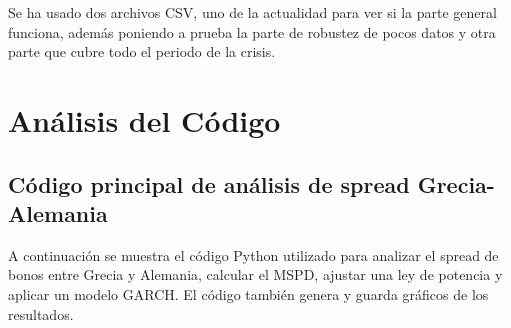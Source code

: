 \documentclass[12pt,a4paper]{article}
\begin{document}
Se ha usado dos archivos CSV, uno de la actualidad para ver si la parte general funciona, además poniendo a prueba la parte de robustez de pocos datos y otra parte que cubre todo el periodo de la crisis.

\section{Análisis del Código}

\subsection{Código principal de análisis de spread Grecia-Alemania}

A continuación se muestra el código Python utilizado para analizar el spread de bonos entre Grecia y Alemania, calcular el MSPD, ajustar una ley de potencia y aplicar un modelo GARCH. El código también genera y guarda gráficos de los resultados.
\end{document}
